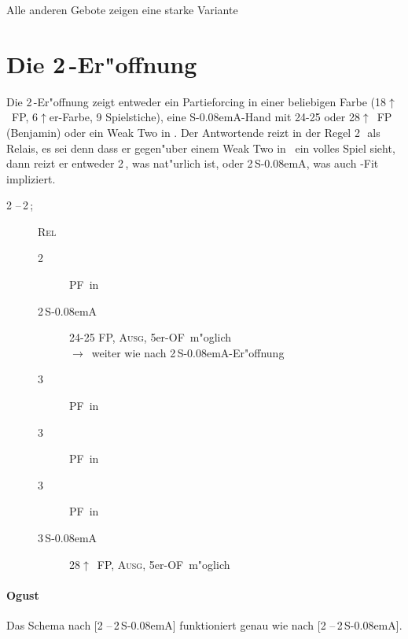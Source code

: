 \documentclass[11pt,german,twocolumn]{scrartcl}
\def\pik{\nobreak\,\Sp}
\def\coe{\nobreak\,\He}
\def\kar{\nobreak\,\Di}
\def\tre{\nobreak\,\Cl}
\def\co{\He}
\def\ka{\Di}
\def\ra{$\rightarrow$}
\def\pl{$\uparrow$}
\def\ofa{\nobreak\textsf{OF}}
\def\sa{\nobreak\textsf{S\kern-0.08emA}}
\def\SA{\nobreak\,\sa}
\def\sep{\nobreak\,--\,}
\def\bal{\textsc{Ausg}}
\def\pf{\textsc{PF}}
\def\rel{\textsc{Rel}}
\def\bdsc{\begin{description}}
\def\edsc{\end{description}}
\newcommand{\Index}[1]{#1\index{#1}}
\begin{document}
Alle anderen Gebote zeigen eine starke Variante

\section{Die 2\kar-Er"offnung}

Die 2\kar-Er"offnung zeigt entweder ein Partieforcing in einer beliebigen Farbe
(18\pl\ FP, 6\pl er-Farbe, 9 Spielstiche), eine \sa-Hand mit 24-25 oder
28\pl~FP (Benjamin) oder ein \Index{Weak Two} in \co. Der Antwortende reizt in der
Regel 2\coe\ als Relais, es sei denn dass er gegen"uber einem Weak Two in \ka\
ein volles Spiel sieht, dann reizt er entweder 2\pik, was nat"urlich ist, oder
2\SA, was auch \co-Fit impliziert.

\bdsc
\item[2\kar\sep2\coe;] \rel
  \bdsc
  \item[2\pik] \pf\ in \pik
  \item[2\SA] 24-25 FP, \bal, 5er-\ofa\ m"oglich \\
    \ra\ weiter wie nach 2\SA-Er"offnung
  \item[3\tre] \pf\ in \tre
  \item[3\kar] \pf\ in \kar
  \item[3\coe] \pf\ in \coe
  \item[3\SA] 28\pl\ FP, \bal, 5er-\ofa\ m"oglich
  \edsc
\edsc

\paragraph{Ogust}

Das Schema nach [2\kar\sep2\SA] funktioniert genau wie nach [2\tre\sep2\SA].
\end{document}
